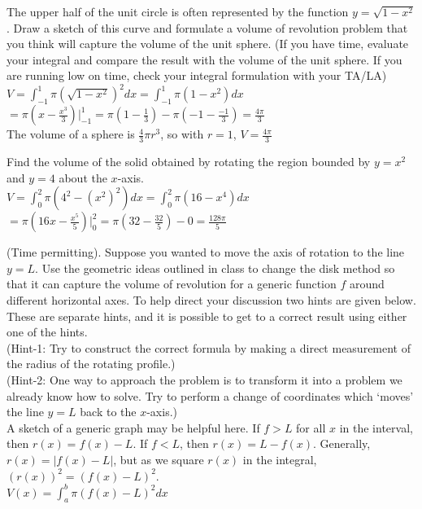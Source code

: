 \documentclass{ximera}
\begin{document}
\begin{exercise}
    The upper half of the unit circle is often represented by the function $y = \sqrt{1-x^2}$. Draw a sketch of this curve and formulate a volume of revolution problem that you think will capture the volume of the unit sphere. (If you have time, evaluate your integral and compare the result with the volume of the unit sphere. If you are running low on time, check your integral formulation with your TA/LA)\\
    {\color{blue} $V=\displaystyle \int_{-1}^1\pi(\sqrt{1-x^2})^2dx=\int_{-1}^1\pi(1-x^2)dx$\\
    $=\pi(x-\frac{x^3}{3})\bigg|_{-1}^1=\pi(1-\frac{1}{3})-\pi(-1-\frac{-1}{3})=\frac{4\pi}{3}$\\
    The volume of a sphere is $\frac{4}{3}\pi r^3$, so with $r=1$, $V=\frac{4\pi}{3}$}
\end{exercise}

\begin{exercise}
    Find the volume of the solid obtained by rotating the region bounded by $y=x^2$ and $y=4$ about the $x$-axis.  \\
    {\color{blue} $V=\displaystyle \int_0^2\pi(4^2-(x^2)^2)dx=\int_0^2\pi(16-x^4)dx$\\
    $=\pi(16x-\frac{x^5}{5})\bigg|_0^2=\pi(32-\frac{32}{5})-0=\frac{128\pi}{5}$}
\end{exercise}

\begin{exercise}
    (Time permitting). Suppose you wanted to move the axis of rotation to the line $y=L$. Use the geometric ideas outlined in class to change the disk method so that it can capture the volume of revolution for a generic function $f$ around different horizontal axes. To help direct your discussion two hints are given below. These are separate hints, and it is possible to get to a correct result using either one of the hints.\\


    (Hint-1: Try to construct the correct formula by making a direct measurement of the radius of the rotating profile.)\\

    (Hint-2: One way to approach the problem is to transform it into a problem we already know how to solve. Try to perform a change of coordinates which `moves' the line $y=L$ back to the $x$-axis.)\\
    
    {\color{blue} A sketch of a generic graph may be helpful here. If $f>L$ for all $x$ in the interval, then $r(x)=f(x)-L$.  If $f<L$, then $r(x)=L-f(x)$.  Generally, $r(x)=|f(x)-L|$, but as we square $r(x)$ in the integral, $(r(x))^2=(f(x)-L)^2$.\\
    $V(x)=\displaystyle \int_a^b \pi (f(x)-L)^2dx $}

\end{exercise}
\end{document}
